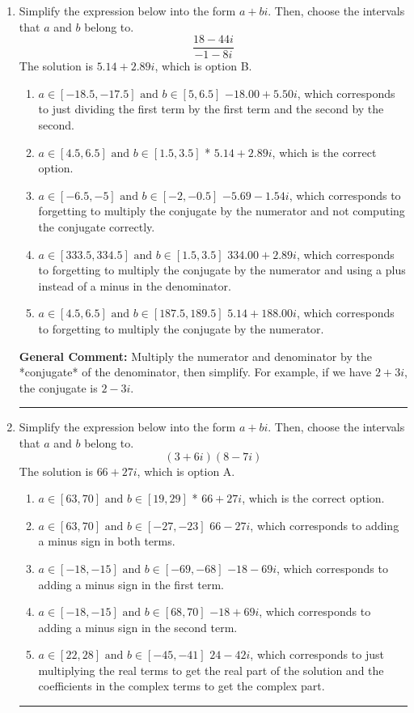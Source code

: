 \documentclass{extbook}[14pt]
\newcommand{\litem}[1]{\item #1

\rule{\textwidth}{0.4pt}}
\begin{document}
\begin{enumerate}
\litem{
Simplify the expression below into the form $a+bi$. Then, choose the intervals that $a$ and $b$ belong to.
\[ \frac{18 - 44 i}{-1 - 8 i} \]
The solution is \( 5.14  + 2.89 i \), which is option B.\begin{enumerate}[label=\Alph*.]
\item \( a \in [-18.5, -17.5] \text{ and } b \in [5, 6.5] \)
 $-18.00  + 5.50 i$, which corresponds to just dividing the first term by the first term and the second by the second.
\item \( a \in [4.5, 6.5] \text{ and } b \in [1.5, 3.5] \)
* $5.14  + 2.89 i$, which is the correct option.
\item \( a \in [-6.5, -5] \text{ and } b \in [-2, -0.5] \)
 $-5.69  - 1.54 i$, which corresponds to forgetting to multiply the conjugate by the numerator and not computing the conjugate correctly.
\item \( a \in [333.5, 334.5] \text{ and } b \in [1.5, 3.5] \)
 $334.00  + 2.89 i$, which corresponds to forgetting to multiply the conjugate by the numerator and using a plus instead of a minus in the denominator.
\item \( a \in [4.5, 6.5] \text{ and } b \in [187.5, 189.5] \)
 $5.14  + 188.00 i$, which corresponds to forgetting to multiply the conjugate by the numerator.
\end{enumerate}

\textbf{General Comment:} Multiply the numerator and denominator by the *conjugate* of the denominator, then simplify. For example, if we have $2+3i$, the conjugate is $2-3i$.
}
\litem{
Simplify the expression below into the form $a+bi$. Then, choose the intervals that $a$ and $b$ belong to.
\[ (3 + 6 i)(8 - 7 i) \]
The solution is \( 66 + 27 i \), which is option A.\begin{enumerate}[label=\Alph*.]
\item \( a \in [63, 70] \text{ and } b \in [19, 29] \)
* $66 + 27 i$, which is the correct option.
\item \( a \in [63, 70] \text{ and } b \in [-27, -23] \)
 $66 - 27 i$, which corresponds to adding a minus sign in both terms.
\item \( a \in [-18, -15] \text{ and } b \in [-69, -68] \)
 $-18 - 69 i$, which corresponds to adding a minus sign in the first term.
\item \( a \in [-18, -15] \text{ and } b \in [68, 70] \)
 $-18 + 69 i$, which corresponds to adding a minus sign in the second term.
\item \( a \in [22, 28] \text{ and } b \in [-45, -41] \)
 $24 - 42 i$, which corresponds to just multiplying the real terms to get the real part of the solution and the coefficients in the complex terms to get the complex part.
\end{enumerate}

}
\end{enumerate}
\end{document}
